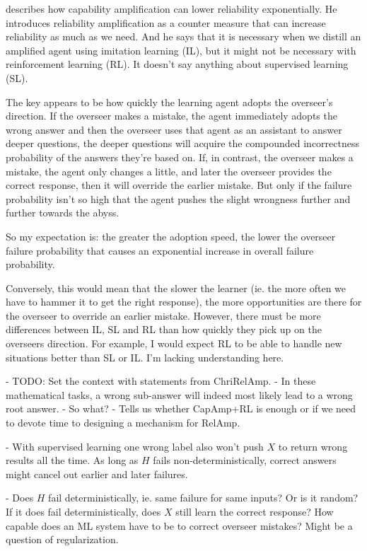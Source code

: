 \documentclass{farlamp}
\begin{document}
\textcite{ChriRelAmp} describes how capability amplification can lower
reliability exponentially. He introduces reliability amplification as a counter
measure that can increase reliability as much as we need. And he says that it is
necessary when we distill an amplified agent using imitation learning (IL), but
it might not be necessary with reinforcement learning (RL). It doesn't say
anything about supervised learning (SL).

The key appears to be how quickly the learning agent adopts the overseer's
direction. If the overseer makes a mistake, the agent immediately adopts the
wrong answer and then the overseer uses that agent as an assistant to answer
deeper questions, the deeper questions will acquire the compounded incorrectness
probability of the answers they're based on. If, in contrast, the overseer makes
a mistake, the agent only changes a little, and later the overseer provides the
correct response, then it will override the earlier mistake. But only if the
failure probability isn't so high that the agent pushes the slight wrongness
further and further towards the abyss.

So my expectation is: the greater the adoption speed, the lower the overseer
failure probability that causes an exponential increase in overall failure
probability.

Conversely, this would mean that the slower the learner (ie. the more often we
have to hammer it to get the right response), the more opportunities are there
for the overseer to override an earlier mistake. However, there must be more
differences between IL, SL and RL than how quickly they pick up on the overseers
direction. For example, I would expect RL to be able to handle new situations
better than SL or IL. I'm lacking understanding here.

- TODO: Set the context with statements from ChriRelAmp.
- In these mathematical tasks, a wrong sub-answer will indeed most likely lead
to a wrong root answer.
- So what?
    - Tells us whether CapAmp+RL is enough or if we need to devote time to
    designing a mechanism for RelAmp.

- \OQ With supervised learning one wrong label also won't push $X$ to return
wrong results all the time. As long as $H$ fails non-deterministically, correct
answers might cancel out earlier and later failures.

- \OQ Does $H$ fail deterministically, ie. same failure for same inputs? Or is
it random? If it does fail deterministically, does $X$ still learn the correct
response? How capable does an ML system have to be to correct overseer mistakes?
Might be a question of regularization.
\end{document}
